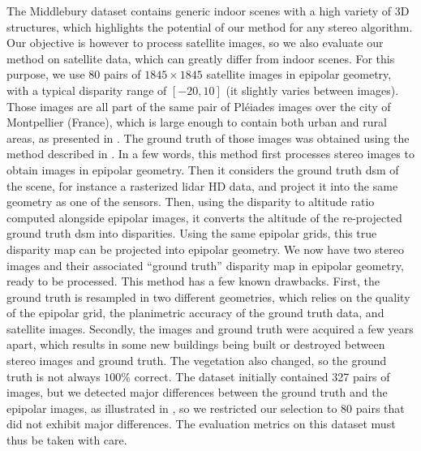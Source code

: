 The Middlebury dataset contains generic indoor scenes with a high variety of 3D structures, which highlights the potential of our method for any stereo algorithm. Our objective is however to process satellite images, so we also evaluate our method on satellite data, which can greatly differ from indoor scenes. For this purpose, we use 80 pairs of $1845\times1845$ satellite images in epipolar geometry, with a typical disparity range of $[-20, 10]$ (it slightly varies between images). Those images are all part of the same pair of Pléiades images over the city of Montpellier (France), which is large enough to contain both urban and rural areas, as presented in . The ground truth of those images was obtained using the method described in \cite{cournet_ground_2020}. In a few words, this method first processes stereo images to obtain images in epipolar geometry. Then it considers the ground truth \acrshort{dsm} of the scene, for instance a rasterized \acrshort{lidar} HD data, and project it into the same geometry as one of the sensors. Then, using the disparity to altitude ratio computed alongside epipolar images, it converts the altitude of the re-projected ground truth \acrshort{dsm} into disparities. Using the same epipolar grids, this true disparity map can be projected into epipolar geometry. We now have two stereo images and their associated ``ground truth'' disparity map in epipolar geometry, ready to be processed. This method has a few known drawbacks. First, the ground truth is resampled in two different geometries, which relies on the quality of the epipolar grid, the planimetric accuracy of the ground truth data, and satellite images. Secondly, the images and ground truth were acquired a few years apart, which results in some new buildings being built or destroyed between stereo images and ground truth. The vegetation also changed, so the ground truth is not always $100\%$ correct. The dataset initially contained 327 pairs of images, but we detected major differences between the ground truth and the epipolar images, as illustrated in , so we restricted our selection to 80 pairs that did not exhibit major differences. The evaluation metrics on this dataset must thus be taken with care.

